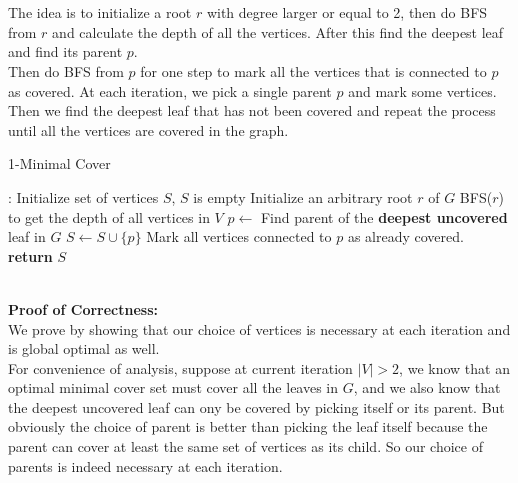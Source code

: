\documentclass[12pt,letterpaper]{article}
\begin{document}
\newpage
\section{}
\subsection{}
The idea is to initialize a root $r$ with degree larger or equal to 2,
then do BFS from $r$ and calculate the depth of all the vertices.
After this find the deepest leaf and find its parent $p$.\\
Then do BFS from $p$ for one step to mark all the vertices that is connected to $p$ as covered.
At each iteration, we pick a single parent $p$ and mark some vertices.\\
Then we find the deepest leaf that has not been covered and repeat the process
until all the vertices are covered in the graph.\\
\begin{algorithm}
  \caption{1-Minimal Cover}\label{alg:1cover}
  \begin{algorithmic}[1]
  :
  \State Initialize set of vertices $S$, $S$ is empty
  \State Initialize an arbitrary root $r$ of $G$ 
  \State BFS($r$) to get the depth of all vertices in $V$
  \State $p\gets$ Find parent of the \textbf{deepest uncovered} leaf in $G$
  \State $S\gets S\cup\{p\}$
  \State Mark all vertices connected to $p$ as already covered.
  \EndWhile
  \State \textbf{return} $S$
  \EndProcedure
  \end{algorithmic}
\end{algorithm}\\
\textbf{Proof of Correctness:}\\
We prove by showing that our choice of vertices is necessary at each iteration 
and is global optimal as well.\\
For convenience of analysis, suppose at current iteration $|V|>2$, 
we know that an optimal minimal cover set must cover all the leaves in $G$,
and we also know that the deepest uncovered leaf can ony be covered
by picking itself or its parent.
But obviously the choice of parent is better than picking the leaf itself
because the parent can cover at least the same set of vertices as its child.
So our choice of parents is indeed necessary at each iteration.\\
\end{document}
